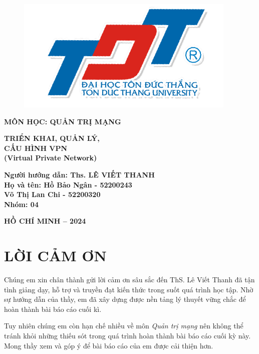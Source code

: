 \documentclass[13pt]{report}
\begin{document}
	\vspace{1cm}
	\begin{figure}[h]
		\centering
		\includegraphics[width=0.3\linewidth]{img/Logo.png}
	\end{figure}	
	\fontsize{18pt}{18pt}\selectfont
	\begin{center}
		\textbf{MÔN HỌC: QUẢN TRỊ MẠNG}
	\end{center}
	\vspace{1cm}
	\fontsize{18pt}{16pt}\selectfont
	\begin{center}\Huge
		\textbf{TRIỂN KHAI, QUẢN LÝ, \\CẤU HÌNH VPN \\(Virtual Private Network)}	
	\end{center}
    \vspace{2cm}
    \fontsize{16pt}{16pt}\selectfont
    \begin{flushright}
        \textbf{Người hướng dẫn: Ths. LÊ VIẾT THANH\\ Họ và tên: Hồ Bảo Ngân - 52200243 \\ Võ Thị Lan Chi - 52200320\\Nhóm: 04}
    \end{flushright}
	\vspace{2cm}
	\begin{center}
		\textbf{HỒ CHÍ MINH – 2024}
	\end{center}
    \newpage
    \section*{\centering \fontsize{18pt}{20pt}\selectfont LỜI CẢM ƠN}
    Chúng em xin chân thành gửi lời cảm ơn sâu sắc đến ThS. Lê Viết Thanh đã tận tình giảng dạy, hỗ trợ và truyền đạt kiến thức trong suốt quá trình học tập. Nhờ sự hướng dẫn của thầy, em đã xây dựng được nền tảng lý thuyết vững chắc để hoàn thành bài báo cáo cuối kì.

    Tuy nhiên chúng em còn hạn chế nhiều về môn \textit{Quản trị mạng} nên không thể tránh khỏi những thiếu sót trong quá trình hoàn thành bài báo cáo cuối kỳ này. Mong thầy xem và góp ý để bài báo cáo của em được cải thiện hơn.
\end{document}
